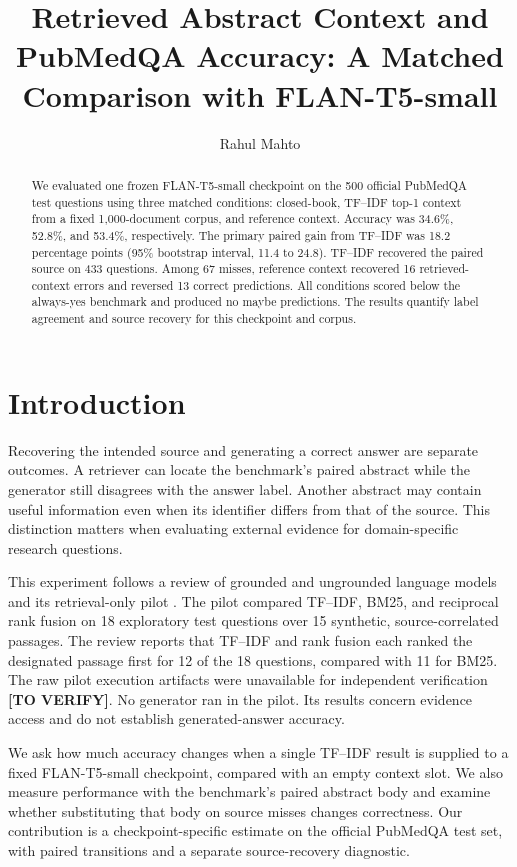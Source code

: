 \documentclass[manuscript,nonacm]{acmart}
\title{Retrieved Abstract Context and PubMedQA Accuracy: A Matched Comparison with FLAN-T5-small}
\author{Rahul Mahto}
\affiliation{\institution{Indian Institute of Information Technology Allahabad}\country{India}}
\begin{document}
\begin{abstract}
We evaluated one frozen FLAN-T5-small checkpoint on the 500 official PubMedQA test questions using three matched conditions: closed-book, TF--IDF top-1 context from a fixed 1,000-document corpus, and reference context. Accuracy was 34.6\%, 52.8\%, and 53.4\%, respectively. The primary paired gain from TF--IDF was 18.2 percentage points (95\% bootstrap interval, 11.4 to 24.8). TF--IDF recovered the paired source on 433 questions. Among 67 misses, reference context recovered 16 retrieved-context errors and reversed 13 correct predictions. All conditions scored below the always-yes benchmark and produced no maybe predictions. The results quantify label agreement and source recovery for this checkpoint and corpus.
\end{abstract}
\maketitle
\section{Introduction}
Recovering the intended source and generating a correct answer are separate outcomes. A retriever can locate the benchmark's paired abstract while the generator still disagrees with the answer label. Another abstract may contain useful information even when its identifier differs from that of the source. This distinction matters when evaluating external evidence for domain-specific research questions.

This experiment follows a review of grounded and ungrounded language models and its retrieval-only pilot \cite{mahtoReview}. The pilot compared TF--IDF, BM25, and reciprocal rank fusion on 18 exploratory test questions over 15 synthetic, source-correlated passages. The review reports that TF--IDF and rank fusion each ranked the designated passage first for 12 of the 18 questions, compared with 11 for BM25. The raw pilot execution artifacts were unavailable for independent verification \textbf{[TO VERIFY]}. No generator ran in the pilot. Its results concern evidence access and do not establish generated-answer accuracy.

We ask how much accuracy changes when a single TF--IDF result is supplied to a fixed FLAN-T5-small checkpoint, compared with an empty context slot. We also measure performance with the benchmark's paired abstract body and examine whether substituting that body on source misses changes correctness. Our contribution is a checkpoint-specific estimate on the official PubMedQA test set, with paired transitions and a separate source-recovery diagnostic.
\end{document}
